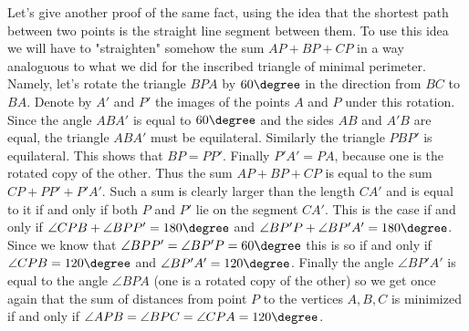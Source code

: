 Let's give another proof of the same fact, using the idea that the shortest path between two points is the straight line segment between them. To use this idea we will have to "straighten" somehow the sum $AP+BP+CP$ in a way analoguous to what we did for the inscribed triangle of minimal perimeter.
Namely, let's rotate the triangle $BPA$ by $60\degree$ in the direction from $BC$ to $BA$. Denote by $A'$ and $P'$ the images of the points $A$ and $P$ under this rotation. Since the angle $ABA'$ is equal to $60\degree$ and the sides $AB$ and $A'B$ are equal, the triangle $ABA'$ must be equilateral. Similarly the triangle $PBP'$ is equilateral. This shows that $BP=PP'$. Finally $P'A'=PA$, because one is the rotated copy of the other. Thus the sum $AP+BP+CP$ is equal to the sum $CP+PP'+P'A'$. Such a sum is clearly larger than the length $CA'$ and is equal to it if and only if both $P$ and $P'$ lie on the segment $CA'$. This is the case if and only if $\angle CPB+\angle BPP'=180\degree$ and $\angle BP'P+\angle BP'A'=180\degree$. Since we know that $\angle BPP'=\angle BP'P=60\degree$ this is so if and only if $\angle CPB=120\degree$ and $\angle BP'A'=120\degree$. Finally the angle $\angle BP'A'$ is equal to the angle $\angle BPA$ (one is a rotated copy of the other) so we get once again that the sum of distances from point $P$ to the vertices $A,B,C$ is minimized if and only if $\angle APB=\angle BPC = \angle CPA = 120\degree$.
